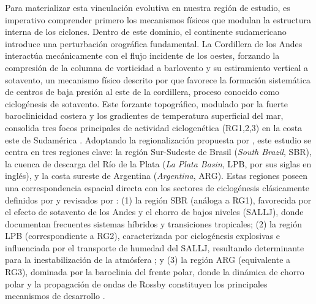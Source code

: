 Para materializar esta vinculación evolutiva en nuestra región de estudio, es imperativo comprender primero los mecanismos físicos que modulan la estructura interna de los ciclones. Dentro de este dominio, el continente sudamericano introduce una perturbación orográfica fundamental. La Cordillera de los Andes interactúa mecánicamente con el flujo incidente de los oestes, forzando la compresión de la columna de vorticidad a barlovento y su estiramiento vertical a sotavento, un mecanismo físico descrito por \citet{gan1994influence} que favorece la formación sistemática de centros de baja presión al este de la cordillera, proceso conocido como ciclogénesis de sotavento.
Este forzante topográfico, modulado por la fuerte baroclinicidad costera y los gradientes de temperatura superficial del mar, consolida tres focos principales de actividad ciclogenética (RG1,2,3) en la costa este de Sudamérica \citep{reboita2026meteorology}. Adoptando la regionalización propuesta por \citet{gramcianinov2019properties}\label{sec:definicion_regiones}, este estudio se centra en tres regiones clave: la región Sur-Sudeste de Brasil (\textit{South Brazil}, SBR), la cuenca de descarga del Río de la Plata (\textit{La Plata Basin}, LPB, por sus siglas en inglés), y la costa sureste de Argentina (\textit{Argentina}, ARG). Estas regiones poseen una correspondencia espacial directa con los sectores de ciclogénesis clásicamente definidos por \citet{reboita2010south} y revisados por \citet{reboita2026meteorology}: (1) la región SBR (análoga a RG1), favorecida por el efecto de sotavento de los Andes y el chorro de bajos niveles (SALLJ), donde \citet{reboita2022from} documentan frecuentes sistemas híbridos y transiciones tropicales; (2) la región LPB (correspondiente a RG2), caracterizada por ciclogénesis explosivas e influenciada por el transporte de humedad del SALLJ, resultando determinante para la inestabilización de la atmósfera \citep{crespo2020potential}; y (3) la región ARG (equivalente a RG3), dominada por la baroclinia del frente polar, donde la dinámica de chorro polar y la propagación de ondas de Rossby constituyen los principales mecanismos de desarrollo \citep{simmonds2000variability}.


